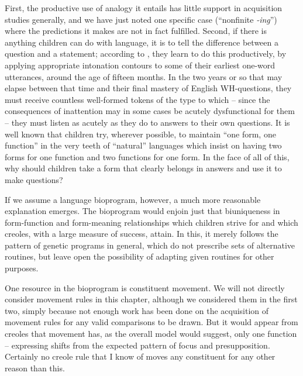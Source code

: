 First, the productive use of analogy it entails has little support in acquisition studies generally, and we have just noted one specific case (``nonfinite \textit{-ing}'') where the predictions it makes are not in fact fulfilled. Second, if there is anything children can do with language, it is to tell the difference between a question and a statement; according to \citet{Halliday1975}, they learn to do this productively, by applying appropriate intonation contours to some of their earliest one-word utterances, around the age of fifteen months. In the two years or so that may elapse between that time and their final mastery of English WH-questions, they must receive countless well-formed tokens of the type to which -- since the consequences of inattention may in some cases be acutely dysfunctional for them -- they must listen as acutely as they do to answers to their own questions. It is well known that children try, wherever possible, to maintain ``one form, one function'' in the very teeth of ``natural'' languages which insist on having two forms for one function and two functions for one form. In the face of
all of this, why should children take a form that clearly belongs in answers and use it to make questions?

If we assume a language bioprogram, however, a much more reasonable explanation emerges. The bioprogram would enjoin just that biuniqueness in form-function and form-meaning relationships which children strive for and which creoles, with a large measure of success, attain. In this, it merely follows the pattern of genetic programs in general, which do not prescribe sets of alternative routines, but leave open the possibility of adapting given routines for other purposes.

One resource in the bioprogram is constituent movement. We will not directly consider movement rules in this chapter, although we considered them in the first two, simply because not enough work has been done on the acquisition of movement rules for any valid comparisons to be drawn. But it would appear from creoles that movement has, as the overall model would suggest, only one function -- expressing shifts from the expected pattern of focus and presupposition. Certainly no creole rule that I know of moves any constituent for any other reason than this.

